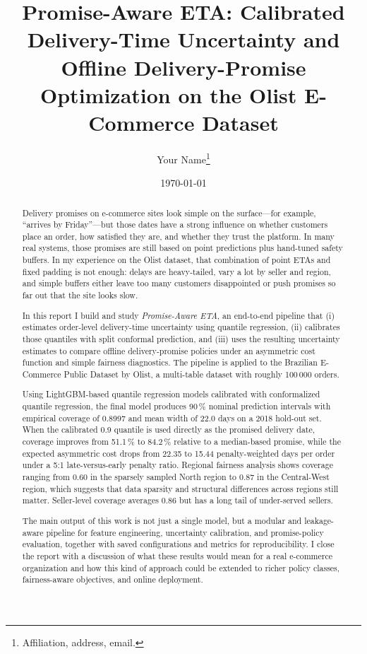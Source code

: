 \documentclass[10pt,twocolumn]{article}
\title{Promise-Aware ETA: Calibrated Delivery-Time Uncertainty and Offline Delivery-Promise Optimization on the Olist E-Commerce Dataset}
\author{
  Your Name\thanks{Affiliation, address, email.}
}
\date{\today}
\begin{document}
\maketitle

\begin{abstract}
Delivery promises on e-commerce sites look simple on the surface---for example, ``arrives by Friday''---but those dates have a strong influence on whether customers place an order, how satisfied they are, and whether they trust the platform. In many real systems, those promises are still based on point predictions plus hand-tuned safety buffers. In my experience on the Olist dataset, that combination of point ETAs and fixed padding is not enough: delays are heavy-tailed, vary a lot by seller and region, and simple buffers either leave too many customers disappointed or push promises so far out that the site looks slow.

In this report I build and study \emph{Promise-Aware ETA}, an end-to-end pipeline that (i) estimates order-level delivery-time uncertainty using quantile regression, (ii) calibrates those quantiles with split conformal prediction, and (iii) uses the resulting uncertainty estimates to compare offline delivery-promise policies under an asymmetric cost function and simple fairness diagnostics. The pipeline is applied to the Brazilian E-Commerce Public Dataset by Olist, a multi-table dataset with roughly 100\,000 orders.

Using LightGBM-based quantile regression models calibrated with conformalized quantile regression, the final model produces 90\,\% nominal prediction intervals with empirical coverage of 0.8997 and mean width of 22.0 days on a 2018 hold-out set. When the calibrated 0.9 quantile is used directly as the promised delivery date, coverage improves from 51.1\,\% to 84.2\,\% relative to a median-based promise, while the expected asymmetric cost drops from 22.35 to 15.44 penalty-weighted days per order under a 5:1 late-versus-early penalty ratio. Regional fairness analysis shows coverage ranging from 0.60 in the sparsely sampled North region to 0.87 in the Central-West region, which suggests that data sparsity and structural differences across regions still matter. Seller-level coverage averages 0.86 but has a long tail of under-served sellers.

The main output of this work is not just a single model, but a modular and leakage-aware pipeline for feature engineering, uncertainty calibration, and promise-policy evaluation, together with saved configurations and metrics for reproducibility. I close the report with a discussion of what these results would mean for a real e-commerce organization and how this kind of approach could be extended to richer policy classes, fairness-aware objectives, and online deployment.
\end{abstract}
\end{document}
